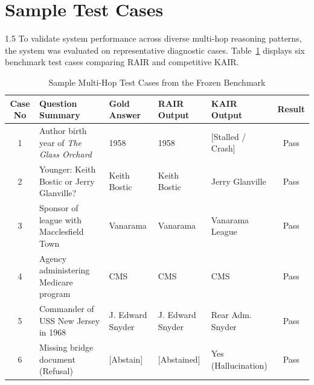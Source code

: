 \documentclass[12pt,a4paper]{report}
\begin{document}
\section{Sample Test Cases}
\begin{spacing}{1.5}
To validate system performance across diverse multi-hop reasoning patterns, the system was evaluated on representative diagnostic cases. Table~\ref{tab:test_cases} displays six benchmark test cases comparing RAIR and competitive KAIR.

\begin{table}[!htbp]
\centering
\small
\begin{tabular}{|c|p{4.8cm}|p{2.2cm}|p{2.2cm}|p{2.2cm}|c|}
\hline
\textbf{Case No} & \textbf{Question Summary} & \textbf{Gold Answer} & \textbf{RAIR Output} & \textbf{KAIR Output} & \textbf{Result} \\
\hline
1 & Author birth year of \textit{The Glass Orchard} & 1958 & 1958 & [Stalled / Crash] & Pass \\
\hline
2 & Younger: Keith Bostic or Jerry Glanville? & Keith Bostic & Keith Bostic & Jerry Glanville & Pass \\
\hline
3 & Sponsor of league with Macclesfield Town & Vanarama & Vanarama & Vanarama League & Pass \\
\hline
4 & Agency administering Medicare program & CMS & CMS & CMS & Pass \\
\hline
5 & Commander of USS New Jersey in 1968 & J. Edward Snyder & J. Edward Snyder & Rear Adm. Snyder & Pass \\
\hline
6 & Missing bridge document (Refusal) & [Abstain] & [Abstained] & Yes (Hallucination) & Pass \\
\hline
\end{tabular}
\caption{Sample Multi-Hop Test Cases from the Frozen Benchmark}
\label{tab:test_cases}
\end{table}
\end{spacing}
\end{document}
